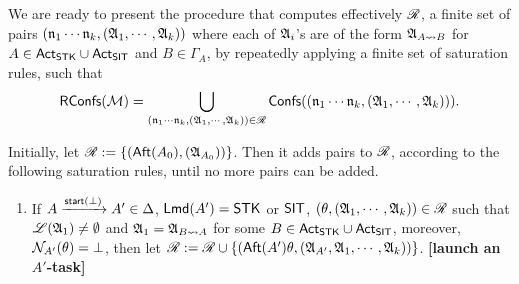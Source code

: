 We are ready to present the procedure that computes effectively $\mathscr{R}$, a finite set of pairs $(\mathfrak{n}_1 \cdots \mathfrak{n}_k, ({\mathfrak{A} }_1, \cdots, {\mathfrak{A} }_k))$ where each of ${\mathfrak{A} }_i$'s are of the form ${\mathfrak{A} }_{A\rightsquigarrow B}$ for $A \in {\sf Act}_{\sf STK}\cup{\sf Act}_{\sf SIT}$ and $B \in \Gamma_A$, by repeatedly applying a finite set of saturation rules, such that
\[\mathsf{RConfs}({\mathcal{M} }) = \bigcup \limits_{(\mathfrak{n}_1 \cdots \mathfrak{n}_k, ({\mathfrak{A} }_1, \cdots, {\mathfrak{A} }_k)) \in \mathscr{R}} {\mathsf{Confs} }((\mathfrak{n}_1 \cdots \mathfrak{n}_k, ({\mathfrak{A} }_1, \cdots, {\mathfrak{A} }_k))).\]

Initially, let $\mathscr{R} := \{({\sf Aft}(A_0),({\mathfrak{A} }_{A_0}))\}$.
Then it adds pairs to $\mathscr{R}$, according to the following saturation rules, until no more pairs can be added. 

\smallskip
\fbox
{
\begin{minipage}{0.9\textwidth}
\begin{enumerate}
    \item If $A \xrightarrow{{\mathsf{start} }(\bot)}A' \in\Delta$, ${\sf Lmd}(A')=\mathsf{STK}$ or ${\sf SIT}$, $(\theta, ({\mathfrak{A} }_1,\cdots,{\mathfrak{A} }_k)) \in \mathscr{R}$ such that ${\mathscr{L} }({\mathfrak{A} }_1) \neq \emptyset$ and ${\mathfrak{A} }_1 = {\mathfrak{A} }_{B\rightsquigarrow A}$ for some $B \in {\sf Act}_{\sf STK}\cup{\sf Act}_{\sf SIT}$, moreover, $\mathcal{N}_{A'}(\theta) = \bot$,
    then let $\mathscr{R}: = \mathscr{R} \cup \{({\sf Aft}(A')\theta, ({\mathfrak{A} }_{A'},{\mathfrak{A} }_1,\cdots,{\mathfrak{A} }_k))\}$.
        \textbf{[launch an $A'$-task]}


\end{enumerate}
\end{minipage}}
